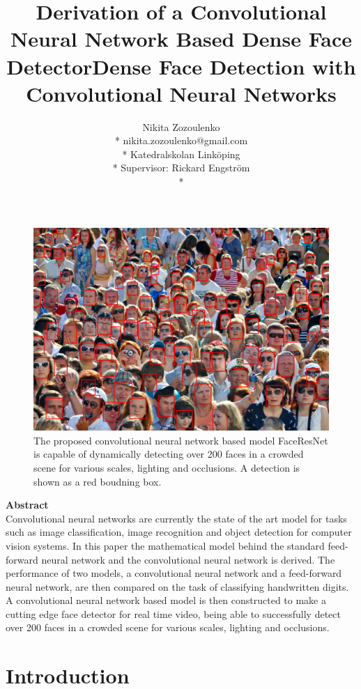 \documentclass[a4paper, twoside]{article}
\title{Derivation of a Convolutional Neural Network Based Dense Face Detector}
\title{Dense Face Detection with Convolutional Neural Networks}
\author{Nikita Zozoulenko \\*
nikita.zozoulenko@gmail.com \\*
Katedralskolan Linköping\\*
Supervisor: Rickard Engström \\*}
\begin{document}
\maketitle

\vfill
\begin{figure}[h]
	\centering
  		\includegraphics[scale=0.221]{resultscrowd2.png}
  	\caption{The proposed convolutional neural network based model FaceResNet is capable of dynamically detecting over 200 faces in a crowded scene for various scales, lighting and occlusions. A detection is shown as a red boudning box.} \label{crowd}
\end{figure}
\vfill

\newpage

\Large{\textbf{Abstract}}\\

Convolutional neural networks are currently the state of the art model for tasks such as image classification, image recognition and object detection for computer vision systems. In this paper the mathematical model behind the standard feed-forward neural network and the convolutional neural network is derived. The performance of two models, a convolutional neural network and a feed-forward neural network, are then compared on the task of classifying handwritten digits. A convolutional neural network based model is then constructed to make a cutting edge face detector for real time video, being able to successfully detect over 200 faces in a crowded scene for various scales, lighting and occlusions.
\newpage

\tableofcontents
\newpage
\section{Introduction}
\end{document}
